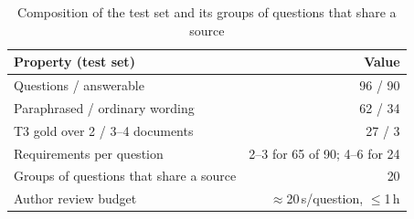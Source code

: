 \begin{table}[tp]
\caption{Composition of the test set and its groups of questions that share a source}
\label{tab:composition}
\centering
\small
\begin{tabular}{@{}lr@{}}
\toprule
Property (test set) & Value \\
\midrule
Questions / answerable & 96 / 90 \\
Paraphrased / ordinary wording & 62 / 34 \\
T3 gold over 2 / 3--4 documents & 27 / 3 \\
Requirements per question & 2--3 for 65 of 90; 4--6 for 24 \\
Groups of questions that share a source & 20 \\
\midrule
Author review budget & ${\approx}$20\,s/question, $\le$1\,h \\
\bottomrule
\end{tabular}
\end{table}
